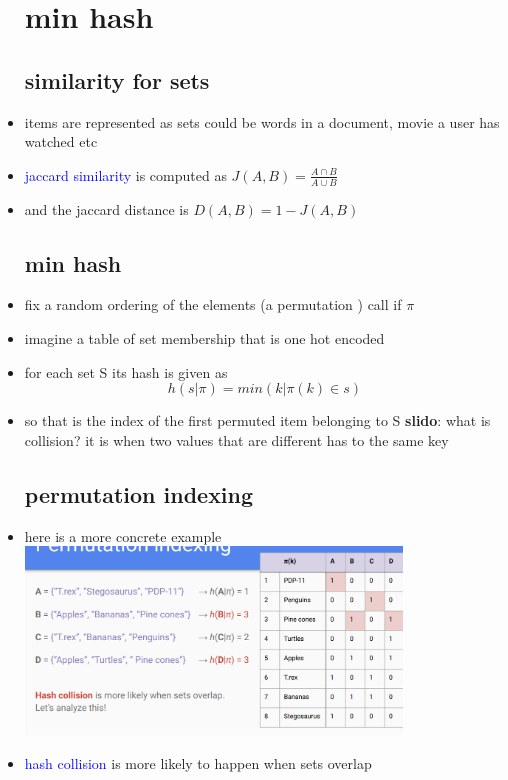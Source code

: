 \documentclass{article}
\begin{document}
\begin{itemize}
\section*{min hash}
\subsection*{similarity for sets}
\item items are represented as sets could be words in a document, movie a user has watched etc 
\item \textcolor{blue}{jaccard similarity } is computed as $J(A,B)=\frac{A\cap B}{A\cup B} $
\item and the jaccard distance is $D(A,B)=1-J(A,B)$
\subsection*{min hash}
\item fix a random ordering of the elements (a permutation ) call if $\pi$
\item imagine a table of set membership that is one hot encoded
\item for each set S its hash is given as $$h(s|\pi)= min( k|\pi(k)\in s  )$$
\item so that is the index of the first permuted item belonging to S
\textbf{slido}: what is collision? it is when two values that are different has to the same key
\subsection*{permutation indexing}
\item here is a more concrete example \\ \includegraphics*[width=10cm]{images/Screenshot 2023-05-11 at 1.28.43 AM.png}
\item \textcolor{blue}{hash collision } is more likely to happen when sets overlap

\end{itemize}
\end{document}
